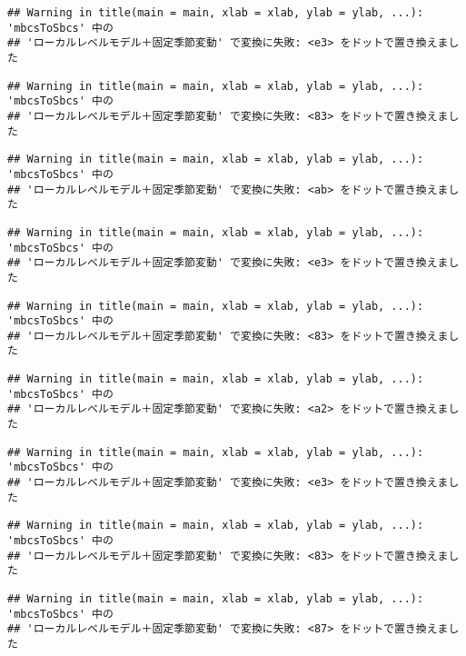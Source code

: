 \documentclass[]{article}
\begin{document}
\begin{verbatim}
## Warning in title(main = main, xlab = xlab, ylab = ylab, ...): 'mbcsToSbcs' 中の
## 'ローカルレベルモデル＋固定季節変動' で変換に失敗: <e3> をドットで置き換えました
\end{verbatim}

\begin{verbatim}
## Warning in title(main = main, xlab = xlab, ylab = ylab, ...): 'mbcsToSbcs' 中の
## 'ローカルレベルモデル＋固定季節変動' で変換に失敗: <83> をドットで置き換えました
\end{verbatim}

\begin{verbatim}
## Warning in title(main = main, xlab = xlab, ylab = ylab, ...): 'mbcsToSbcs' 中の
## 'ローカルレベルモデル＋固定季節変動' で変換に失敗: <ab> をドットで置き換えました
\end{verbatim}

\begin{verbatim}
## Warning in title(main = main, xlab = xlab, ylab = ylab, ...): 'mbcsToSbcs' 中の
## 'ローカルレベルモデル＋固定季節変動' で変換に失敗: <e3> をドットで置き換えました
\end{verbatim}

\begin{verbatim}
## Warning in title(main = main, xlab = xlab, ylab = ylab, ...): 'mbcsToSbcs' 中の
## 'ローカルレベルモデル＋固定季節変動' で変換に失敗: <83> をドットで置き換えました
\end{verbatim}

\begin{verbatim}
## Warning in title(main = main, xlab = xlab, ylab = ylab, ...): 'mbcsToSbcs' 中の
## 'ローカルレベルモデル＋固定季節変動' で変換に失敗: <a2> をドットで置き換えました
\end{verbatim}

\begin{verbatim}
## Warning in title(main = main, xlab = xlab, ylab = ylab, ...): 'mbcsToSbcs' 中の
## 'ローカルレベルモデル＋固定季節変動' で変換に失敗: <e3> をドットで置き換えました
\end{verbatim}

\begin{verbatim}
## Warning in title(main = main, xlab = xlab, ylab = ylab, ...): 'mbcsToSbcs' 中の
## 'ローカルレベルモデル＋固定季節変動' で変換に失敗: <83> をドットで置き換えました
\end{verbatim}

\begin{verbatim}
## Warning in title(main = main, xlab = xlab, ylab = ylab, ...): 'mbcsToSbcs' 中の
## 'ローカルレベルモデル＋固定季節変動' で変換に失敗: <87> をドットで置き換えました
\end{verbatim}
\end{document}
